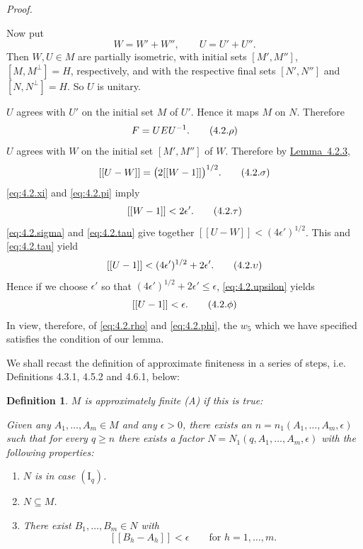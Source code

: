 \documentclass[b5paper,twoside]{article}
\newcommand{\lemref}[2]{\hyperref[#1]{\mbox{Lemma~#2}}}
\theoremstyle{mvnplain}
\newtheorem{definition}{Definition}[section]
\renewenvironment{proof}[1][Proof]{%
  \par\addvspace{0.35\baselineskip}%
  \noindent\textit{#1.}\ \normalfont\ignorespaces
}{%
  \par\addvspace{0.35\baselineskip}%
}
\newcommand{\M}{\mathbf M}
\newcommand{\N}{\mathbf N}
\newcommand{\Hilbert}{\mathfrak H}
\newcommand{\Metric}[1]{\left[\!\left[#1\right]\!\right]}
\def\M{M}%
\def\N{N}%
\def\Hilbert{H}%
\def\Metric#1{[[#1]]}%
\def\mathfrak#1{#1}%
\begin{document}
\begin{proof}
Now put
\[
  W=W'+W'',\qquad U=U'+U''.
\]
Then \(W,U\in\M\) are partially isometric, with initial sets
\([\mathfrak M',\mathfrak M'']\),
\([\mathfrak M,\mathfrak M^{\perp}]=\Hilbert\), respectively, and with the
respective final sets \([\mathfrak N',\mathfrak N'']\) and
\([\mathfrak N,\mathfrak N^{\perp}]=\Hilbert\). So \(U\) is unitary.

\(U\) agrees with \(U'\) on the initial set \(\mathfrak M\) of \(U'\). Hence
it maps \(\mathfrak M\) on \(\mathfrak N\). Therefore
\begin{equation}\label{eq:4.2.rho}
  F=UEU^{-1}.
  \tag{4.2.\ensuremath{\rho}}
\end{equation}
\(U\) agrees with \(W\) on the initial set
\([\mathfrak M',\mathfrak M'']\) of \(W\). Therefore by
\lemref{lem:4.2.3}{4.2.3},
\begin{equation}\label{eq:4.2.sigma}
  \Metric{U-W}=\bigl(2\Metric{W-1}\bigr)^{1/2}.
  \tag{4.2.\ensuremath{\sigma}}
\end{equation}
\eqref{eq:4.2.xi} and \eqref{eq:4.2.pi} imply
\begin{equation}\label{eq:4.2.tau}
  \Metric{W-1}<2\epsilon'.
  \tag{4.2.\ensuremath{\tau}}
\end{equation}
\eqref{eq:4.2.sigma} and \eqref{eq:4.2.tau} give together
\(\Metric{U-W}<(4\epsilon')^{1/2}\). This and \eqref{eq:4.2.tau} yield
\begin{equation}\label{eq:4.2.upsilon}
  \Metric{U-1}<(4\epsilon')^{1/2}+2\epsilon'.
  \tag{4.2.\ensuremath{\upsilon}}
\end{equation}
Hence if we choose \(\epsilon'\) so that
\((4\epsilon')^{1/2}+2\epsilon'\le\epsilon\),
\eqref{eq:4.2.upsilon} yields
\begin{equation}\label{eq:4.2.phi}
  \Metric{U-1}<\epsilon.
  \tag{4.2.\ensuremath{\phi}}
\end{equation}
In view, therefore, of \eqref{eq:4.2.rho} and \eqref{eq:4.2.phi}, the \(w_5\)
which we have specified satisfies the condition of our lemma.
\end{proof}

We shall recast the definition of approximate finiteness in a series of steps,
i.e. Definitions 4.3.1, 4.5.2 and 4.6.1, below:

\begin{definition}\label{def:4.3.1}
\(\M\) is approximately finite (A) if this is true:

Given any \(A_1,\ldots,A_m\in\M\) and any \(\epsilon>0\), there exists an
\(n=n_1(A_1,\ldots,A_m,\epsilon)\) such that for every \(q\ge n\) there
exists a factor
\(\N=\N_1(q,A_1,\ldots,A_m,\epsilon)\) with the following properties:
\begin{enumerate}[label=\((\roman*)\)]
\item \(\N\) is in case \((\mathrm I_q)\).
\item \(\N\subseteq\M\).
\item There exist \(B_1,\ldots,B_m\in\N\) with
\[
  \Metric{B_h-A_h}<\epsilon\qquad\text{for }h=1,\ldots,m.
\]
\end{enumerate}
\end{definition}
\end{document}
